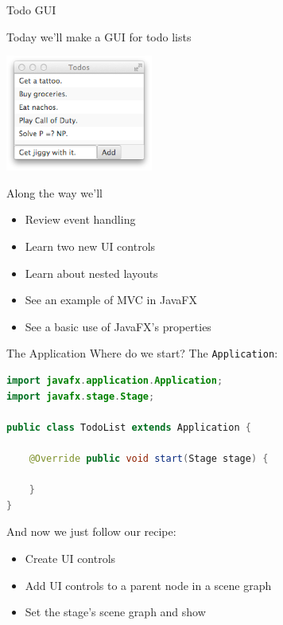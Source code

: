 \documentclass{beamer}
\begin{document}
\begin{frame}
  \titlepage
\end{frame}


\begin{frame}[fragile]{Todo GUI}

Today we'll make a GUI for todo lists
\begin{center}
\includegraphics[height=1.5in]{javafx-todo.png}
\end{center}

Along the way we'll
\begin{itemize}
\item Review event handling
\item Learn two new UI controls
\item Learn about nested layouts
\item See an example of MVC in JavaFX
\item See a basic use of JavaFX's properties
\end{itemize}


\end{frame}

\begin{frame}[fragile]{The Application}
Where do we start?  The {\tt Application}:
\begin{lstlisting}[language=Java]
import javafx.application.Application;
import javafx.stage.Stage;

public class TodoList extends Application {

    @Override public void start(Stage stage) {

    }
}
\end{lstlisting}

And now we just follow our recipe:
\begin{itemize}
\item Create UI controls
\item Add UI controls to a parent node in a scene graph
\item Set the stage's scene graph and show
\end{itemize}


\end{frame}
\end{document}
